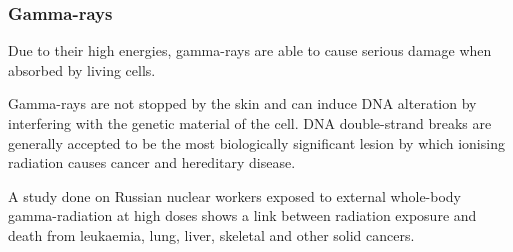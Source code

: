             \subsubsection*{Gamma-rays}
            \nopagebreak
        \label{m38779*id189632}Due to their high energies, gamma-rays are able to cause serious damage when absorbed by living cells.\par 
        \label{m38779*id189636}Gamma-rays are not stopped by the skin and can induce DNA alteration by interfering with the genetic material of the cell. DNA double-strand breaks are generally accepted to be the most biologically significant lesion by which ionising radiation causes cancer and hereditary disease.\par 
        \label{m38779*id189642}A study done on Russian nuclear workers exposed to external whole-body gamma-radiation at high doses shows a link between radiation exposure and death from leukaemia, lung, liver, skeletal and other solid cancers.\par 
      \label{m38779*eip-665}



